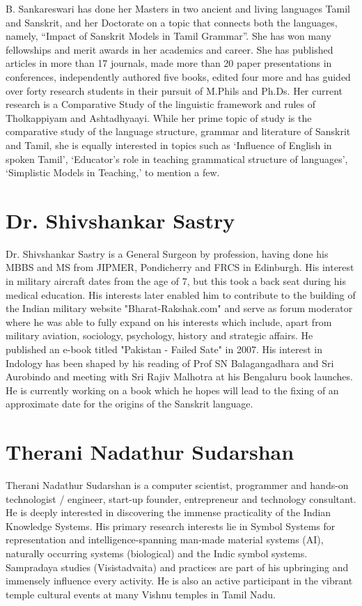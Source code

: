 B. Sankareswari has done her Masters in two ancient and living languages Tamil and Sanskrit, and her Doctorate on a topic that connects both the languages, namely, “Impact of Sanskrit Models in Tamil Grammar”. She has won many fellowships and merit awards in her academics and career. She has published articles in more than 17 journals, made more than 20 paper presentations in conferences, independently authored five books, edited four more and has guided over forty research students in their pursuit of M.Phils and Ph.Ds. Her current research is a Comparative Study of the linguistic framework and rules of Tholkappiyam and Ashtadhyaayi. While her prime topic of study is the comparative study of the language structure, grammar and literature of Sanskrit and Tamil, she is equally interested in topics such as ‘Influence of English in spoken Tamil’, ‘Educator’s role in teaching grammatical structure of languages’, ‘Simplistic Models in Teaching,’ to mention a few.

\section*{Dr. Shivshankar Sastry}

Dr. Shivshankar Sastry is a General Surgeon by profession, having done his MBBS and MS from JIPMER, Pondicherry and FRCS in Edinburgh. His interest in military aircraft dates from the age of 7, but this took a back seat during his medical education. His interests later enabled him to contribute to the building of the Indian military website "Bharat-Rakshak.com" and serve as forum moderator where he was able to fully expand on his interests which include, apart from military aviation, sociology, psychology, history and strategic affairs. He published an e-book titled "Pakistan - Failed Sate" in 2007. His interest in Indology has been shaped by his reading of Prof SN Balagangadhara and Sri Aurobindo and meeting with Sri Rajiv Malhotra at his Bengaluru book launches. He is currently working on a book which he hopes will lead to the fixing of an approximate date for the origins of the Sanskrit language.

\section*{Therani Nadathur Sudarshan}

Therani Nadathur Sudarshan is a computer scientist, programmer and hands-on technologist / engineer, start-up founder, entrepreneur and technology consultant. He is deeply interested in discovering the immense practicality of the Indian Knowledge Systems. His primary\break
 research interests lie in Symbol Systems for representation and\break
 intelligence-spanning man-made material systems (AI), naturally occurring systems (biological) and the Indic symbol systems. Sampradaya studies (Visistadvaita) and practices are part of his upbringing and immensely influence every activity. He is also an active participant in the vibrant temple cultural events at many Vishnu temples in Tamil Nadu.

